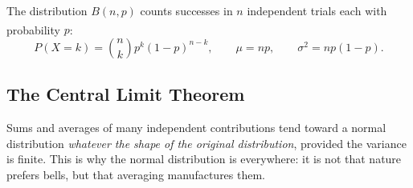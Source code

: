 The  distribution $B(n,p)$ counts successes in $n$
independent trials each with probability
$p$\textsuperscript{\cite{downeyThinkBayes2016}}:
\begin{equation}
  P(X=k) = \binom{n}{k}p^k(1-p)^{n-k},
  \qquad \mu = np,\qquad \sigma^2 = np(1-p).
  \label{eq:math-binomial}
\end{equation}

\subsection{The Central Limit Theorem}

Sums and averages of many independent contributions tend toward a normal
distribution \emph{whatever the shape of the original distribution}, provided
the variance is finite. This is why the normal distribution is everywhere: it
is not that nature prefers bells, but that averaging manufactures them.

